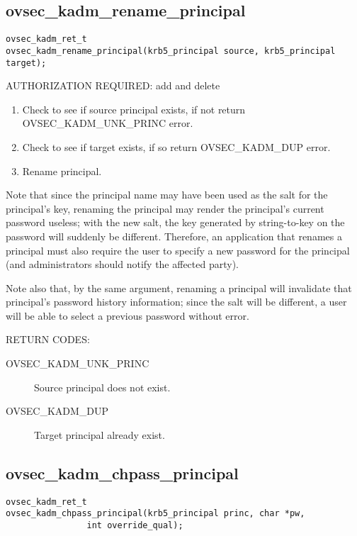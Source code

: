 \subsection{ovsec_kadm_rename_principal}

\begin{verbatim}
ovsec_kadm_ret_t
ovsec_kadm_rename_principal(krb5_principal source, krb5_principal target);
\end{verbatim}

AUTHORIZATION REQUIRED: add and delete

\begin{enumerate}
\item Check to see if source principal exists, if not return
OVSEC_KADM_UNK_PRINC error. 
\item Check to see if target exists, if so return OVSEC_KADM_DUP error.
\item Rename principal.
\end{enumerate}

Note that since the principal name may have been used as the salt for
the principal's key, renaming the principal may render the principal's
current password useless; with the new salt, the key generated by
string-to-key on the password will suddenly be different.  Therefore,
an application that renames a principal must also require the user to
specify a new password for the principal (and administrators should
notify the affected party).

Note also that, by the same argument, renaming a principal will
invalidate that principal's password history information; since the
salt will be different, a user will be able to select a previous
password without error.

RETURN CODES: 

\begin{description}
\item[OVSEC_KADM_UNK_PRINC] Source principal does not exist.
\item[OVSEC_KADM_DUP] Target principal already exist.
\end{description}

\subsection{ovsec_kadm_chpass_principal}

\begin{verbatim}
ovsec_kadm_ret_t
ovsec_kadm_chpass_principal(krb5_principal princ, char *pw, 
                int override_qual);
\end{verbatim}

